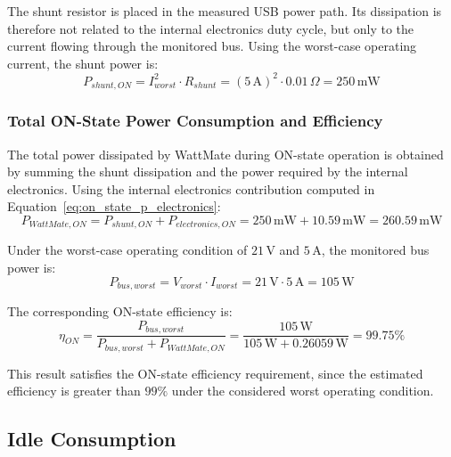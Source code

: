 The shunt resistor is placed in the measured USB power path. 
Its dissipation is therefore not related to the internal electronics duty cycle, but only to the current flowing through the monitored bus. 
Using the worst-case operating current, the shunt power is:
\begin{equation}
	\label{eq:on_state_p_shunt}
	P_{shunt,ON} = I_{worst}^{2} \cdot R_{shunt}
	= \left(5\,\mathrm{A}\right)^2 \cdot 0.01\,\Omega
	= 250\,\mathrm{mW}
\end{equation}


\subsubsection{Total ON-State Power Consumption and Efficiency}
\label{sec:total_on_state_power_consumption}

The total power dissipated by WattMate during ON-state operation is obtained by summing the shunt dissipation and the power required by the internal electronics. 
Using the internal electronics contribution computed in Equation~\ref{eq:on_state_p_electronics}:
\begin{equation}
	\label{eq:on_state_p_wattmate}
	P_{WattMate,ON} = P_{shunt,ON} + P_{electronics,ON}
	= 250\,\mathrm{mW} + 10.59\,\mathrm{mW}
	= 260.59\,\mathrm{mW}
\end{equation}

Under the worst-case operating condition of \(21\,\mathrm{V}\) and \(5\,\mathrm{A}\), the monitored bus power is:
\begin{equation}
	\label{eq:on_state_p_bus_worst}
	P_{bus,worst} = V_{worst} \cdot I_{worst}
	= 21\,\mathrm{V} \cdot 5\,\mathrm{A}
	= 105\,\mathrm{W}
\end{equation}

The corresponding ON-state efficiency is:
\begin{equation}
	\label{eq:on_state_efficiency}
	\eta_{ON}
	= \frac{P_{bus,worst}}{P_{bus,worst} + P_{WattMate,ON}}
	= \frac{105\,\mathrm{W}}{105\,\mathrm{W} + 0.26059\,\mathrm{W}}
	= 99.75\%
\end{equation}

This result satisfies the ON-state efficiency requirement, since the estimated efficiency is greater than \(99\%\) under the considered worst operating condition.



\subsection{Idle Consumption}
\label{sec:idle_consumption}


